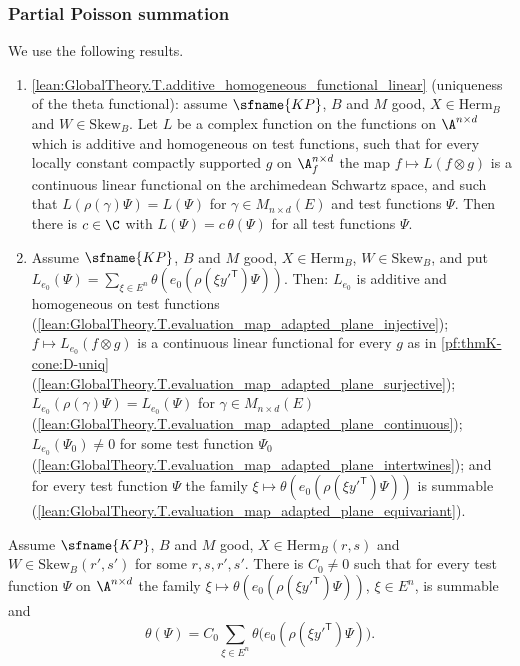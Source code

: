\subsubsection{Partial Poisson summation}
We use the following results.
\begin{enumerate}[resume*=thmKconeD]
\item\label{pf:thmK-cone:D-uniq} \cref{lean:GlobalTheory.T.additive_homogeneous_functional_linear} (uniqueness of the
  theta functional): assume $\sfname{KP}$, $B$ and $M$ good, $X\in\mathrm{Herm}_B$ and $W\in\mathrm{Skew}_B$.  Let $L$ be a
  complex function on the functions on $\A^{n\times d}$ which is additive and homogeneous on test functions, such that
  for every locally constant compactly supported $g$ on $\A_f^{n\times d}$ the map $f\mapsto L(f\otimes g)$ is a
  continuous linear functional on the archimedean Schwartz space, and such that $L(\rho(\gamma)\Psi)=L(\Psi)$ for
  $\gamma\in M_{n\times d}(E)$ and test functions $\Psi$.  Then there is $c\in\C$ with $L(\Psi)=c\,\theta(\Psi)$ for all
  test functions $\Psi$.
\item\label{pf:thmK-cone:D-Lprop} Assume $\sfname{KP}$, $B$ and $M$ good, $X\in\mathrm{Herm}_B$, $W\in\mathrm{Skew}_B$, and
  put $L_{e_0}(\Psi)=\sum_{\xi\in E^n}\theta(e_0(\rho(\xi y'^{\mathsf T})\Psi))$.  Then: $L_{e_0}$ is additive and
  homogeneous on test functions (\cref{lean:GlobalTheory.T.evaluation_map_adapted_plane_injective}); $f\mapsto
  L_{e_0}(f\otimes g)$ is a continuous linear functional for every $g$ as in \ref{pf:thmK-cone:D-uniq}
  (\cref{lean:GlobalTheory.T.evaluation_map_adapted_plane_surjective}); $L_{e_0}(\rho(\gamma)\Psi)=L_{e_0}(\Psi)$ for
  $\gamma\in M_{n\times d}(E)$ (\cref{lean:GlobalTheory.T.evaluation_map_adapted_plane_continuous});
  $L_{e_0}(\Psi_0)\neq0$ for some test function $\Psi_0$
  (\cref{lean:GlobalTheory.T.evaluation_map_adapted_plane_intertwines}); and for every test function $\Psi$ the family
  $\xi\mapsto\theta(e_0(\rho(\xi y'^{\mathsf T})\Psi))$ is summable
  (\cref{lean:GlobalTheory.T.evaluation_map_adapted_plane_equivariant}).
\end{enumerate}

\begin{lemma}\label{pf:thmK-cone:mixed}
Assume $\sfname{KP}$, $B$ and $M$ good, $X\in\mathrm{Herm}_B(r,s)$ and $W\in\mathrm{Skew}_B(r',s')$ for some $r,s,r',s'$.
There is $C_0\neq0$ such that for every test function $\Psi$ on $\A^{n\times d}$ the family
$\xi\mapsto\theta(e_0(\rho(\xi y'^{\mathsf T})\Psi))$, $\xi\in E^n$, is summable and
\begin{equation}\label{pf:thmK-cone:eq-mixed}
  \theta(\Psi)=C_0\sum_{\xi\in E^n}\theta\bigl(e_0(\rho(\xi y'^{\mathsf T})\Psi)\bigr).
\end{equation}
\end{lemma}

